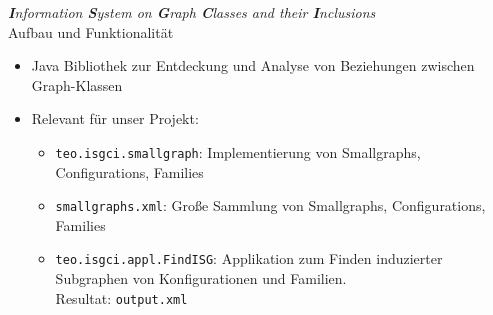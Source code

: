 \newcommand{\hl}[1]{\textbf{\LARGE#1}}

\begin{frame}[<+->]{{\it\hl{I}{\large nformation} \hl{S}{\large ystem on} \hl{G}{\large raph}
  \hl{C}{\large lasses and their} \hl{I}{\large nclusions}}\\Aufbau und Funktionalität}{}
	\begin{itemize}
	  \item Java Bibliothek zur Entdeckung und Analyse von Beziehungen zwischen Graph-Klassen
	  \item Relevant für unser Projekt:
	  \begin{itemize}
	    \setlength\itemsep{1em}
	    \item {\tt teo.isgci.smallgraph}: Implementierung von Smallgraphs, Configurations, Families
	    \item {\tt smallgraphs.xml}: Große Sammlung von Smallgraphs, Configurations, Families
	    \item {\tt teo.isgci.appl.FindISG}: Applikation zum Finden induzierter Subgraphen von
	      Konfigurationen und Familien. \\
	      Resultat: {\tt output.xml}
	  \end{itemize}
	\end{itemize}
\end{frame}
